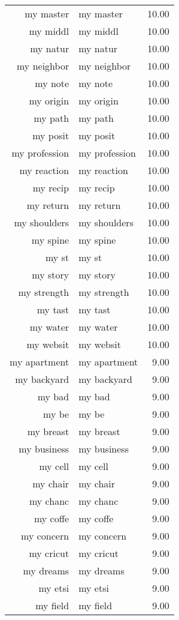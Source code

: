 \begin{table}[ht]
\begin{tabular}{rlr}
  my master & my master & 10.00 \\ 
  my middl & my middl & 10.00 \\ 
  my natur & my natur & 10.00 \\ 
  my neighbor & my neighbor & 10.00 \\ 
  my note & my note & 10.00 \\ 
  my origin & my origin & 10.00 \\ 
  my path & my path & 10.00 \\ 
  my posit & my posit & 10.00 \\ 
  my profession & my profession & 10.00 \\ 
  my reaction & my reaction & 10.00 \\ 
  my recip & my recip & 10.00 \\ 
  my return & my return & 10.00 \\ 
  my shoulders & my shoulders & 10.00 \\ 
  my spine & my spine & 10.00 \\ 
  my st & my st & 10.00 \\ 
  my story & my story & 10.00 \\ 
  my strength & my strength & 10.00 \\ 
  my tast & my tast & 10.00 \\ 
  my water & my water & 10.00 \\ 
  my websit & my websit & 10.00 \\ 
  my apartment & my apartment & 9.00 \\ 
  my backyard & my backyard & 9.00 \\ 
  my bad & my bad & 9.00 \\ 
  my be & my be & 9.00 \\ 
  my breast & my breast & 9.00 \\ 
  my business & my business & 9.00 \\ 
  my cell & my cell & 9.00 \\ 
  my chair & my chair & 9.00 \\ 
  my chanc & my chanc & 9.00 \\ 
  my coffe & my coffe & 9.00 \\ 
  my concern & my concern & 9.00 \\ 
  my cricut & my cricut & 9.00 \\ 
  my dreams & my dreams & 9.00 \\ 
  my etsi & my etsi & 9.00 \\ 
  my field & my field & 9.00 \\ 

\end{tabular}
\end{table}
